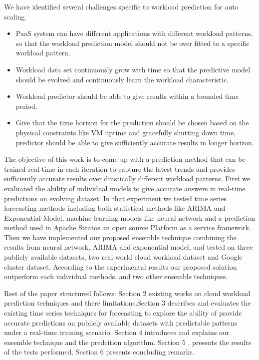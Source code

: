 We have identified several challenges specific to workload prediction for auto scaling.
\begin{itemize}
\item PaaS system can have different applications with different workload patterns, so that the workload prediction model should not be over fitted to a specific workload pattern.
\item Workload data set continuously grow with time so that the predictive model should be evolved and continuously learn the workload characteristic. 
\item Workload predictor should be able to give results within a bounded time period.
\item Give that the  time horizon for the prediction should be chosen based on the physical constraints like VM uptime and gracefully shutting down time, predictor should be able to give sufficiently accurate results in longer horizon.
\end{itemize}

The objective of this work is to come up with a prediction method that can be trained real-time in each iteration to capture the latest trends and provides sufficiently accurate results over drastically different workload patterns. First we evaluated the ability of individual models to give accurate answers in real-time predictions on evolving dataset. In that experiment we tested time series forecasting methods including both statistical methods like ARIMA and Exponential Model, machine learning models like neural network and a prediction method used in Apache Stratos an open source Platform as a service framework. Then we have implemented our proposed ensemble technique combining the results from neural network, ARIMA and exponential model, and tested on three publicly available datasets, two real-world cloud workload dataset and Google cluster dataset. According to the experimental results our proposed solution outperform each individual methods, and two other ensemble techniques.

Rest of the paper structured follows: Section 2 existing works on cloud workload prediction techniques and there limitations.Section 3 describes and evaluates the existing time series techniques for forecasting to explore the ability of provide  accurate predictions on publicly available datasets with predictable patterns under a real-time training scenario. Section 4 introduces and explains our ensemble technique and  the predcition algorithm. Section 5 , presents the results of the tests performed. Section 6 presents concluding remarks.
